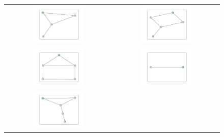 \documentclass[12pt, a4paper]{extarticle}
\begin{document}
\begin{figure}\centering\begin{tabularx}{\textwidth}{cc}
\includegraphics[width=0.5\textwidth]{task11-graphlets/4_16-25-23-24.pdf} &
\includegraphics[width=0.5\textwidth]{task11-graphlets/5_21-19-22-23-24.pdf} \\
\includegraphics[width=0.5\textwidth]{task11-graphlets/5_14-16-21-25-23.pdf} &
\includegraphics[width=0.5\textwidth]{task11-graphlets/2_25-23.pdf} \\
\includegraphics[width=0.5\textwidth]{task11-graphlets/5_21-25-19-22-23.pdf} &

\end{tabularx}
\end{figure}
\end{document}
